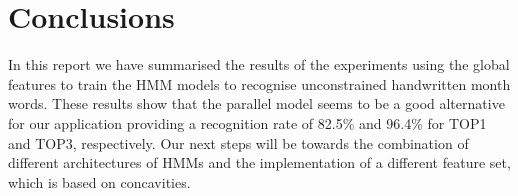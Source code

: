 \documentclass{article}[14pt, oneside, a4paper, times]
\begin{document}
\section{Conclusions}
\label{conclusion:sec}

In this report we have summarised the results of the experiments using the global features to train the HMM models to recognise unconstrained handwritten month words. These results show that the parallel model seems to be a good alternative for our application providing a recognition rate of 82.5\% and 96.4\% for TOP1 and TOP3, respectively. Our next steps will be towards the combination of different architectures of HMMs and the implementation of a different feature set, which is based on concavities. 





\end{document}
